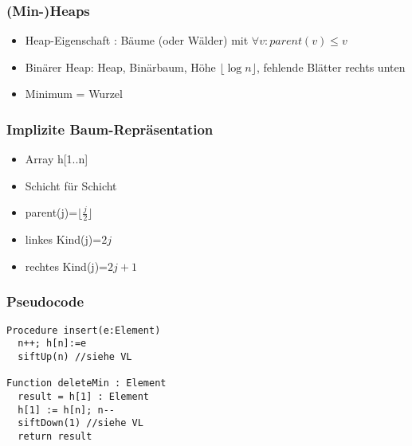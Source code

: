 \begin{frame}
\frametitle{(Min-)Heaps}
\begin{itemize}
\item Heap-Eigenschaft : Bäume (oder Wälder) mit $\forall v:parent(v)\leq v$\pause
\item Binärer Heap: Heap, Binärbaum, Höhe $\lfloor \log n\rfloor$, fehlende Blätter rechts unten\pause
\item Minimum = Wurzel
\end{itemize}
\end{frame}

\begin{frame}
\frametitle{Implizite Baum-Repräsentation}
\begin{itemize}
\item Array h[1..n]
\item Schicht für Schicht\pause
\item parent(j)=$\lfloor \frac{j}{2}\rfloor$
\item linkes Kind(j)=$2j$
\item rechtes Kind(j)=$2j+1$
\end{itemize}
\end{frame}

\begin{frame}[fragile]
\frametitle{Pseudocode}
\begin{lstlisting}
Procedure insert(e:Element)
  n++; h[n]:=e
  siftUp(n) //siehe VL
  
Function deleteMin : Element
  result = h[1] : Element
  h[1] := h[n]; n--
  siftDown(1) //siehe VL
  return result
\end{lstlisting}
\end{frame}
